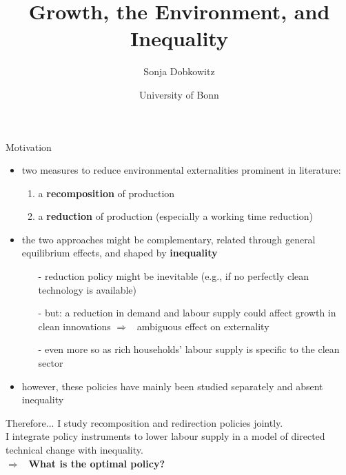 \documentclass[11pt,aspectratio=169]{beamer}
\author[Sonja Dobkowitz]{\small Sonja Dobkowitz}
\title{Growth, the Environment, and Inequality}
\date{\footnotesize{University of Bonn}}
\institute{December 14, 2021}
\newcommand{\ar}{$\Rightarrow$ \ }
\begin{document}
	
	{
		\begin{frame}
		\titlepage
	\end{frame}
}




\begin{frame}{Motivation}

\begin{itemize}
\item two measures to reduce environmental externalities prominent in literature: 
\begin{enumerate}
\item a \alert{\textbf{recomposition}} of production
\item a \textbf{\alert{reduction}} of production (especially a working time reduction)
\end{enumerate}
\vspace{3mm} 
\item the two approaches might be complementary, related through general equilibrium effects, and shaped by \textbf{\alert{inequality}}
\vspace{3mm}
\begin{itemize}
\item[-] reduction policy might be inevitable (e.g., if no perfectly clean technology is available)
\item[-] but: a reduction in demand and labour supply could affect growth in clean innovations \ar ambiguous effect on externality
\item[-] even more so as rich households' labour supply is specific to the clean sector
\end{itemize}
\vspace{3mm}
\item however,  these policies have mainly been studied separately and absent inequality
\end{itemize}
\end{frame}

\begin{frame}
	\begin{block}{Therefore...}
I study recomposition and redirection policies jointly. 
\\
I integrate policy instruments to lower labour supply in a model of directed technical change with  inequality. \\
\vspace{2mm}
\ar \textbf{What is the optimal policy?}
	\end{block}

\end{frame}
\end{document}
